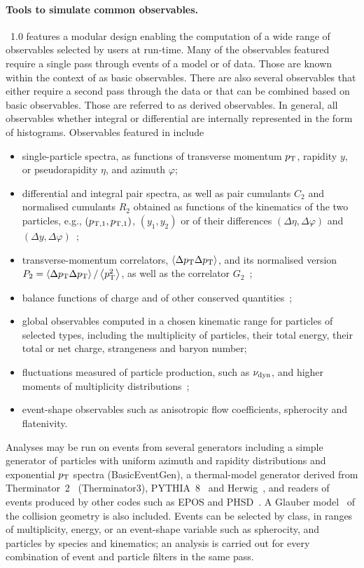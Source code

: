 \paragraph{Tools to simulate common observables.}
\Datum{}~1.0 features a modular design enabling the  computation of a wide range of observables selected by users at run-time.  Many of the observables  featured  require a single pass through  events of a model or of data. Those are known within the context of \Datum{} as basic observables. There are also several observables that either require a second pass through the data or that can be combined  based on basic observables. Those are referred to as derived observables. In general, all observables whether integral or differential are internally represented in the form of histograms.  Observables featured in \Datum{} include 
\begin{itemize}
  \item single-particle spectra, as functions of transverse momentum $p_{\mathrm{T}}$, rapidity $y$, or pseudorapidity $\eta$,
    and azimuth $\varphi$;
  \item differential and integral pair spectra, as well as  pair cumulants $C_2$ and normalised cumulants $R_2$ obtained  as
    functions of the kinematics of the two particles, e.g., $(p_{\rm T,1}, p_{\rm T,1})$, $(y_1,y_2)$  or of their differences $(\Delta\eta,\Delta\varphi)$ and     $(\Delta y,\Delta\varphi)$~\cite{Pruneau:2002yf,Pruneau:2017book};
  \item transverse-momentum correlators, $\left\langle \Delta p_{\mathrm{T}}\Delta p_{\mathrm{T}} \right\rangle$, and its normalised version $P_2=\left\langle \Delta p_{\mathrm{T}}\Delta p_{\mathrm{T}} \right\rangle/\left\langle p_{\rm T}^2 \right\rangle$, as well as the  correlator $G_2$~\cite{Sharma:2008qr,Gavin:2006xd};
  \item balance functions of charge and of other conserved quantities~\cite{Bass:2000az,pruneau2020};
  \item global observables computed in a chosen kinematic range for particles of selected types, including the multiplicity of particles, their total energy,  their total or  net charge, strangeness and baryon number;
  \item fluctuations measured of particle production, such as $\nu_{\mathrm{dyn}}$, and higher moments of multiplicity
    distributions~\cite{Pruneau:2002yf};
  \item event-shape observables such as anisotropic flow coefficients, spherocity and flatenivity.
\end{itemize}

Analyses may be run on events from several generators including  a simple generator of particles with uniform azimuth and
rapidity distributions and exponential $p_{\mathrm{T}}$ spectra (BasicEventGen), a thermal-model generator derived from Therminator~2~\cite{Chojnacki:2011hb}
(Therminator3), PYTHIA~8~\cite{Bierlich:2022pfr} and Herwig~\cite{Bellm:2015jjp}, and readers of events produced by
other codes such as EPOS and PHSD~\cite{Cassing:2009vt}. A Glauber model~\cite{Miller:2007ri} of the collision geometry
is also included. Events can be selected by class, in ranges of multiplicity, energy, or an event-shape
variable such as spherocity, and particles by species and kinematics; an analysis is carried out for every combination of event and
particle filters in the same pass.

